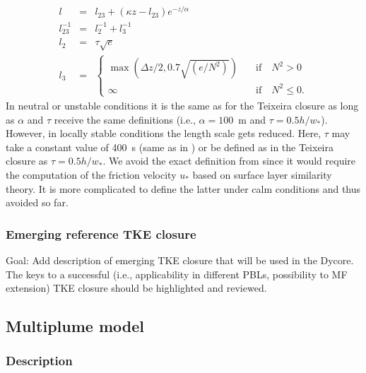 \documentclass[dvipdfmx,a4paper,10pt]{article}
\begin{document}
\begin{eqnarray}
 l &=&l_{23} + (\kappa z - l_{23}) e^{-z/\alpha} \\
 l_{23}^{-1}&=&l_{2}^{-1} + l_{3}^{-1}\\
 l_{2} &=& \tau \sqrt{e}\\
 l_{3} &=& \left\{ 
 \begin{array}{ll}
  \max(\Delta z/2, 0.7 \sqrt{(e/N^2)})&\quad \mathrm{if}\quad N^2>0\\
  \infty &\quad \mathrm{if}\quad N^2\leq 0.
  \end{array}\right.
\end{eqnarray}
In neutral or unstable conditions it is the same as for the Teixeira closure as long as $\alpha$ and $\tau$ receive the same definitions (i.e., $\alpha=100$~m and $\tau=0.5h/w_*$). However, in locally stable conditions the length scale gets reduced. Here, $\tau$ may take a constant value of 400~s (same as in \cite{suselj13}) or be defined as in the Teixeira closure as $\tau=0.5 h/w_*$. We avoid the exact definition from \cite{witek11} since it would require the computation of the friction velocity $u_*$ based on surface layer similarity theory. It is more complicated to define the latter under calm conditions and thus avoided so far.  

\subsubsection{Emerging reference TKE closure}

{\color{blue} Goal: Add description of emerging TKE closure that will be used in the Dycore. The keys to a successful (i.e., applicability in different PBLs, possibility to MF extension) TKE closure should be highlighted and reviewed.}

\subsection{Multiplume model}

\subsubsection{Description}
\end{document}
